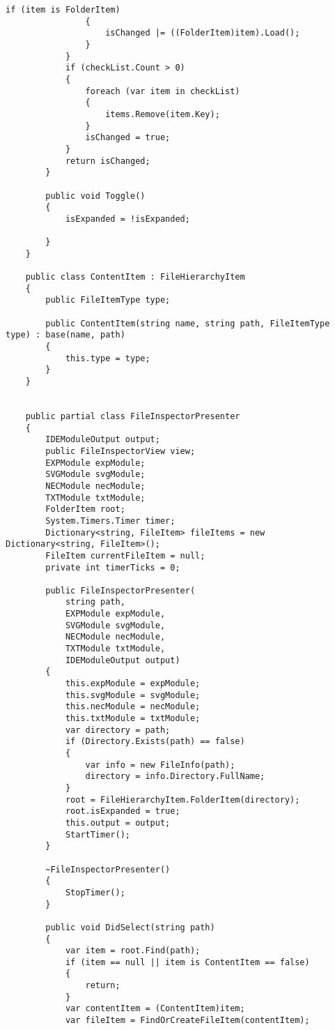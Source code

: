 \documentclass{scrartcl}
\begin{document}
\begin{lstlisting}[language={[Sharp]C}, caption={IDE}, label={experiment}]
                if (item is FolderItem)
                {
                    isChanged |= ((FolderItem)item).Load();
                }
            }
            if (checkList.Count > 0)
            {
                foreach (var item in checkList)
                {
                    items.Remove(item.Key);
                }
                isChanged = true;
            }
            return isChanged;
        }

        public void Toggle()
        {
            isExpanded = !isExpanded;

        }
    }

    public class ContentItem : FileHierarchyItem
    {
        public FileItemType type;

        public ContentItem(string name, string path, FileItemType type) : base(name, path)
        {
            this.type = type;
        }
    }


    public partial class FileInspectorPresenter
    {
        IDEModuleOutput output;
        public FileInspectorView view;
        EXPModule expModule;
        SVGModule svgModule;
        NECModule necModule;
        TXTModule txtModule;
        FolderItem root;
        System.Timers.Timer timer;
        Dictionary<string, FileItem> fileItems = new Dictionary<string, FileItem>();
        FileItem currentFileItem = null;
        private int timerTicks = 0;

        public FileInspectorPresenter(
            string path,
            EXPModule expModule,
            SVGModule svgModule,
            NECModule necModule,
            TXTModule txtModule,
            IDEModuleOutput output)
        {
            this.expModule = expModule;
            this.svgModule = svgModule;
            this.necModule = necModule;
            this.txtModule = txtModule;
            var directory = path;
            if (Directory.Exists(path) == false)
            {
                var info = new FileInfo(path);
                directory = info.Directory.FullName;
            }
            root = FileHierarchyItem.FolderItem(directory);
            root.isExpanded = true;
            this.output = output;
            StartTimer();
        }

        ~FileInspectorPresenter()
        {
            StopTimer();
        }

        public void DidSelect(string path)
        {
            var item = root.Find(path);
            if (item == null || item is ContentItem == false)
            {
                return;
            }
            var contentItem = (ContentItem)item;
            var fileItem = FindOrCreateFileItem(contentItem);


\end{lstlisting}
\end{document}
